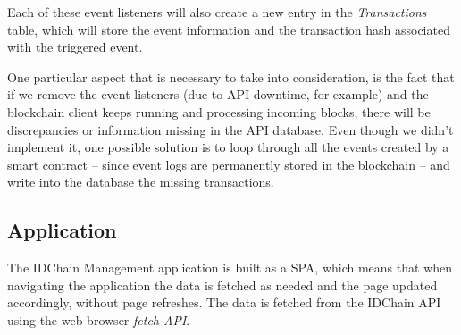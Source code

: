 \begin{table}[h!]
  \centering
  \caption{Database operations associated with each event listener}
\label{table:api-events-database}
\end{table}

Each of these event listeners will also create a new entry in the \textit{Transactions} table, which will store the event information and the transaction hash associated with the triggered event.

One particular aspect that is necessary to take into consideration, is the fact that if we remove the event listeners (due to API downtime, for example) and the blockchain client keeps running and processing incoming blocks, there will be discrepancies or information missing in the API database.
Even though we didn't implement it, one possible solution is to loop through all the events created by a smart contract – since event logs are permanently stored in the blockchain – and write into the database the missing transactions.

\subsection{Application}\label{subsection:mapp}

The IDChain Management application is built as a \ac{SPA}, which means that when navigating the application the data is fetched as needed and the page updated accordingly, without page refreshes.
The data is fetched from the IDChain API using the web browser \textit{fetch API}.

